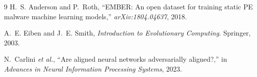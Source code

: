\documentclass[conference]{IEEEtran}
\begin{document}

\begin{thebibliography}{9}
H.~S. Anderson and P.~Roth, ``EMBER: An open dataset for training static PE malware machine learning models,'' \textit{arXiv:1804.04637}, 2018.

A.~E. Eiben and J.~E. Smith, \textit{Introduction to Evolutionary Computing}. Springer, 2003.

N.~Carlini \textit{et al.}, ``Are aligned neural networks adversarially aligned?,'' in \textit{Advances in Neural Information Processing Systems}, 2023.
\end{thebibliography}
\end{document}
